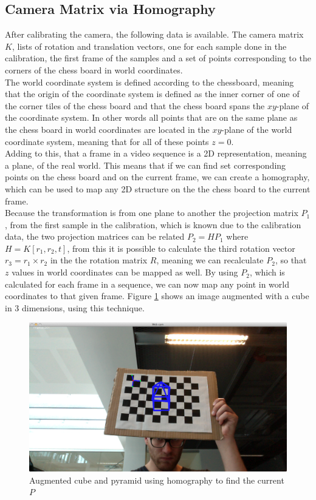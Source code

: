 \documentclass[a4paper,11pt]{article}
\begin{document}
\subsection{Camera Matrix via Homography}
After calibrating the camera, the following data is available. The camera matrix $K$, lists of rotation and translation vectors, one for each sample done in the calibration, the first frame of the samples and a set of points corresponding to the corners of the chess board in world coordinates.\\

The world coordinate system is defined according to the chessboard, meaning that the origin of the coordinate system is defined as the inner corner of one of the corner tiles of the chess board and that the chess board spans the $xy$-plane of the coordinate system. In other words all points that are on the same plane as the chess board in world coordinates are located in the $xy$-plane of the world coordinate system, meaning that for all of these points $z=0$.\\

Adding to this, that a frame in a video sequence is a 2D representation, meaning a plane, of the real world. This means that if we can find set corresponding points on the chess board and on the current frame, we can create a homography, which can be used to map any 2D structure on the the chess board to the current frame.\\

Because the transformation is from one plane to another the projection matrix $P_1$, from  the first sample in the calibration, which is known due to the calibration data, the two projection matrices can be related $P_2 = H P_1$ where $H = K[r_1,r_2,t]$, from this it is possible to calculate the third rotation vector $r_3 = r_1 \times r_2$ in the the rotation matrix $R$, meaning we can recalculate $P_2$, so that $z$ values in world coordinates can be mapped as well. By using $P_2$, which is calculated for each frame in a sequence, we can now map any point in world coordinates to that given frame. Figure \ref{fig:cube_from_homography} shows an image augmented with a cube in 3 dimensions, using this technique.\\


\begin{figure}[H]
\begin{centering}
\includegraphics[width=0.8\linewidth]{cube_from_homography}
\caption{Augmented cube and pyramid using homography to find the current $P$}
\label{fig:cube_from_homography}
\end{centering}
\end{figure}
\end{document}
